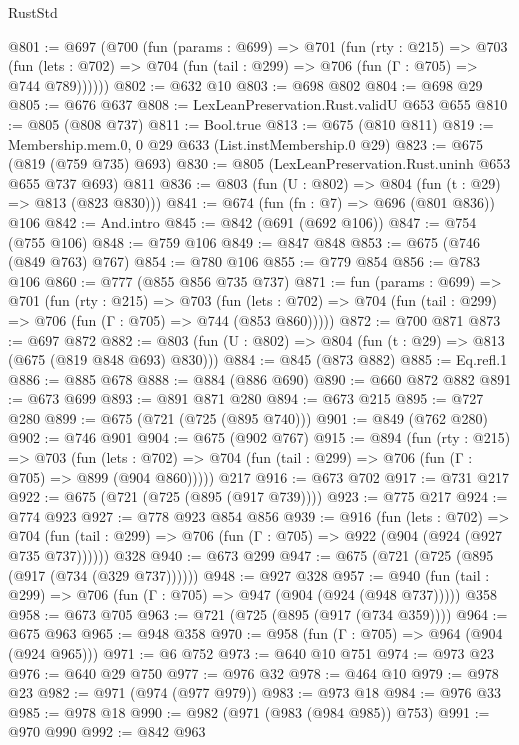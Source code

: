 \begin{lexlean}{RustStd}
\begin{coremodule}
@801 := @697
    (@700
      (fun (params : @699) =>
      @701
        (fun (rty : @215) =>
        @703
          (fun (lets : @702) => @704 (fun (tail : @299) => @706 (fun (Γ : @705) => @744 @789))))))
@802 := @632 @10
@803 := @698 @802
@804 := @698 @29
@805 := @676 @637
@808 := LexLeanPreservation.Rust.validU @653 @655
@810 := @805 (@808 @737)
@811 := Bool.true
@813 := @675 (@810 @811)
@819 := Membership.mem.{0, 0} @29 @633 (List.instMembership.{0} @29)
@823 := @675 (@819 (@759 @735) @693)
@830 := @805 (LexLeanPreservation.Rust.uninh @653 @655 @737 @693) @811
@836 := @803 (fun (U : @802) => @804 (fun (t : @29) => @813 (@823 @830)))
@841 := @674 (fun (fn : @7) => @696 (@801 @836)) @106
@842 := And.intro
@845 := @842 (@691 (@692 @106))
@847 := @754 (@755 @106)
@848 := @759 @106
@849 := @847 @848
@853 := @675 (@746 (@849 @763) @767)
@854 := @780 @106
@855 := @779 @854
@856 := @783 @106
@860 := @777 (@855 @856 @735 @737)
@871 := fun (params : @699) =>
  @701
    (fun (rty : @215) =>
    @703
      (fun (lets : @702) => @704 (fun (tail : @299) => @706 (fun (Γ : @705) => @744 (@853 @860)))))
@872 := @700 @871
@873 := @697 @872
@882 := @803 (fun (U : @802) => @804 (fun (t : @29) => @813 (@675 (@819 @848 @693) @830)))
@884 := @845 (@873 @882)
@885 := Eq.refl.{1}
@886 := @885 @678
@888 := @884 (@886 @690)
@890 := @660 @872 @882
@891 := @673 @699
@893 := @891 @871 @280
@894 := @673 @215
@895 := @727 @280
@899 := @675 (@721 (@725 (@895 @740)))
@901 := @849 (@762 @280)
@902 := @746 @901
@904 := @675 (@902 @767)
@915 := @894
    (fun (rty : @215) =>
    @703
      (fun (lets : @702) => @704 (fun (tail : @299) => @706 (fun (Γ : @705) => @899 (@904 @860)))))
    @217
@916 := @673 @702
@917 := @731 @217
@922 := @675 (@721 (@725 (@895 (@917 @739))))
@923 := @775 @217
@924 := @774 @923
@927 := @778 @923 @854 @856
@939 := @916
    (fun (lets : @702) =>
    @704 (fun (tail : @299) => @706 (fun (Γ : @705) => @922 (@904 (@924 (@927 @735 @737))))))
    @328
@940 := @673 @299
@947 := @675 (@721 (@725 (@895 (@917 (@734 (@329 @737))))))
@948 := @927 @328
@957 := @940 (fun (tail : @299) => @706 (fun (Γ : @705) => @947 (@904 (@924 (@948 @737))))) @358
@958 := @673 @705
@963 := @721 (@725 (@895 (@917 (@734 @359))))
@964 := @675 @963
@965 := @948 @358
@970 := @958 (fun (Γ : @705) => @964 (@904 (@924 @965)))
@971 := @6 @752
@973 := @640 @10 @751
@974 := @973 @23
@976 := @640 @29 @750
@977 := @976 @32
@978 := @464 @10
@979 := @978 @23
@982 := @971 (@974 (@977 @979))
@983 := @973 @18
@984 := @976 @33
@985 := @978 @18
@990 := @982 (@971 (@983 (@984 @985)) @753)
@991 := @970 @990
@992 := @842 @963

\end{coremodule}
\end{lexlean}
